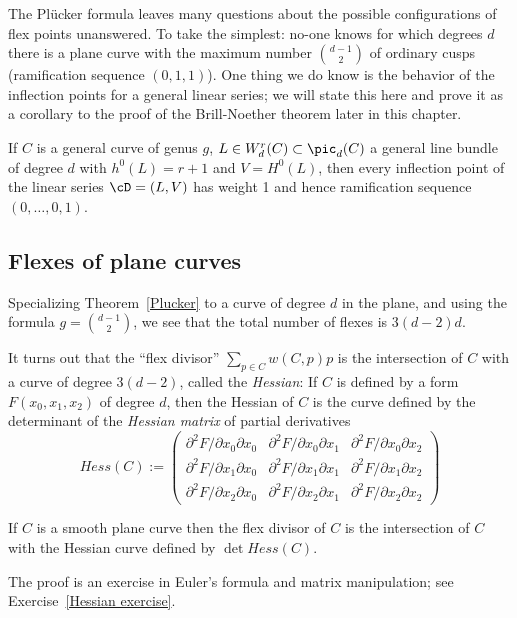 The Pl\"ucker formula leaves many questions about the possible configurations of flex points unanswered. To take the simplest:
no-one knows for which degrees $d$ there is a plane curve with the maximum number ${d-1\choose 2}$ of ordinary cusps (ramification
sequence $(0,1,1)$).  One thing we do know is the behavior of the inflection points for a general linear series; we will state this here and prove it as a corollary to the proof of the Brill-Noether theorem later in this chapter.

\begin{theorem}\label{Brill Noether Plucker}
If $C$ is a general curve of genus $g$, $L \in W^r_d(C) \subset \pic_d(C)$ a general line bundle of degree $d$ with $h^0(L) = r+1$ and $V = H^0(L)$, then every inflection point of the linear series $\cD = (L, V)$ has weight 1 and hence ramification sequence $(0, \dots, 0, 1)$.
\end{theorem}

\subsection{Flexes of plane curves}\label{plane curve pluecker}

Specializing Theorem~\ref{Plucker} to a curve of degree $d$ in the plane, and using the formula
$g= {d-1\choose 2}$, we see that the total number of flexes is $3(d-2)d$. 

It turns out that the ``flex divisor''
$\sum_{p\in C} w(C, p)p$
is the intersection of $C$ with a curve of degree $3(d-2)$, called the \emph{Hessian}: If $C$ is defined by a form $F(x_0, x_1, x_2)$ of degree $d$, then
the Hessian of $C$ is the curve defined by the determinant of the \emph{Hessian matrix} of partial derivatives
$$
Hess(C) :=
\begin{pmatrix}
 \partial^2 F/\partial x_0 \partial x_0 & \partial^2 F/\partial x_0 \partial x_1 & \partial^2 F/\partial x_0 \partial x_2 \\
\partial^2 F/\partial x_1 \partial x_0 & \partial^2 F/\partial x_1 \partial x_1 & \partial^2 F/\partial x_1 \partial x_2 \\
\partial^2 F/\partial x_2 \partial x_0 & \partial^2 F/\partial x_2 \partial x_1 & \partial^2 F/\partial x_2 \partial x_2 
\end{pmatrix}
$$
\begin{theorem}\label{Hessian} If $C$ is a smooth plane curve then the flex divisor of $C$ is the intersection 
of $C$ with the Hessian curve defined by $\det Hess(C)$.
\end{theorem}
The proof is an exercise in Euler's formula and matrix manipulation; see Exercise~\ref{Hessian exercise}.


